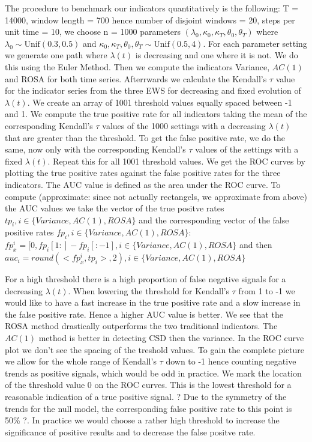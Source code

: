 \documentclass[%
thesis=student,%
coverpage=false,%
titlepage=false,%
headmarks=true, %
german,%
font=libertine, %
math=newpxtx, %
BCOR=5mm,%
coverBCOR=11mm%
]{tumbook}
\begin{document}
The procedure to benchmark our indicators quantitatively is the following:
T = 14000, window length = 700 hence number of disjoint windows = 20, steps per unit time = 10, we choose n = 1000 parameters $(\lambda_{0},\kappa_{0},\kappa_{T},\theta_{0},\theta_{T})$ where $\lambda_{0} \sim \text{Unif}(0.3,0.5)$ and $\kappa_{0},\kappa_{T},\theta_{0},\theta_{T} \sim \text{Unif}(0.5,4)$. For each parameter setting we generate one path where $\lambda(t)$ is decreasing and one where it is not. We do this using the Euler Method. Then we compute the indicators Variance, $AC(1)$ and ROSA for both time series. Afterrwards we calculate the Kendall's $\tau$ value for the indicator series from the three EWS for decreasing and fixed evolution of $\lambda(t)$. We create an array of 1001 threshold values equally spaced between -1 and 1. We compute the true positive rate for all indicators taking the mean of the corresponding Kendall's $\tau$ values of the 1000 settings with a decreasing $\lambda(t)$ that are greater than the threshold. To get the false positive rate, we do the same, now only with the corresponding Kendall's $\tau$ values of the settings with a fixed $\lambda(t)$. Repeat this for all 1001 threshold values. We get the ROC curves by plotting the true positive rates against the false positive rates for the three indicators.
The AUC value is defined as the area under the ROC curve. To compute (approximate: since not actually rectangels, we approximate from above) the AUC values we take the vector of the true positve rates  $tp_{i}, i \in \{Variance,AC(1),ROSA\}$ and the corresponding vector of the false positive rates $fp_{i}, i \in \{Variance,AC(1),ROSA\}$: $fp_{x}^{i} = [0,fp_{i}[1:]-fp_{i}[:-1], i \in \{Variance,AC(1),ROSA\}$ and then $auc_{i} = round(<fp_{x}^{i},tp_{i}>,2), i \in \{Variance,AC(1),ROSA\}$


For a high threshold there is a high proportion of false negative signals for a decreasing $\lambda(t)$. When lowering the threshold for Kendall's $\tau$ from 1 to -1 we would like to have a fast increase in the true positive rate and a slow increase in the false positive rate. Hence a higher AUC value is better. We see that the ROSA method drastically outperforms the two traditional indicators. The $AC(1)$ method is better in detecting CSD then the variance.  
In the ROC curve plot we don't see the spacing of the treshold values. To gain the complete picture we allow for the whole range of Kendall's $\tau$ down to -1 hence counting negative trends as positive signals, which would be odd in practice. We mark the location of the threshold value 0 on the ROC curves. This is the lowest threshold for a reasonable indication of a true positive signal. ? Due to the symmetry of the trends for the null model, the corresponding false positive rate to this point is 50\% ?. In practice we would choose a rather high threshold to increase the significance of positive results and to decrease the false positve rate.
\end{document}
